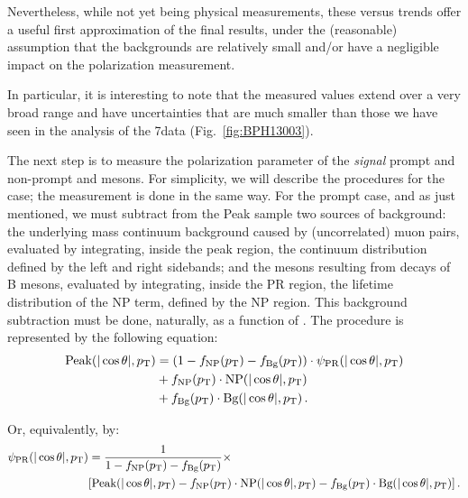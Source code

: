 Nevertheless, while not yet being physical measurements, 
these \lth versus \pt trends offer a useful first approximation of the final results,
under the (reasonable) assumption that 
the backgrounds are relatively small and/or have a negligible 
impact on the polarization measurement.

In particular, it is interesting to note that the measured values 
extend over a very broad \pt range 
and have uncertainties that are much smaller than those we have seen 
in the analysis of the 7\TeV data (Fig.~\ref{fig:BPH13003}).

\vfill\newpage

The next step is to measure the \lth polarization parameter of the \emph{signal} 
prompt and non-prompt \jpsi and \psip mesons. 
For simplicity, we will describe the procedures for the \jpsi case;
the \psip measurement is done in the same way.
For the prompt case, and as just mentioned, 
we must subtract from the Peak sample two sources of background:
the underlying mass continuum background caused by (uncorrelated) muon pairs, 
evaluated by integrating, inside the \jpsi peak region, 
the continuum distribution defined by the left and right sidebands;
and the \jpsi mesons resulting from decays of B mesons,
evaluated by integrating, inside the PR region, 
the lifetime distribution of the NP term, defined by the NP region.
This background subtraction must be done, naturally, as a function of \pt.
The procedure is represented by the following equation:
\begin{equation}
\begin{split} 
\text{Peak}(|\cos\theta|,p_\text{T}) 
&= (1 - f_{\rm NP}(p_\text{T}) - f_{\rm Bg}(p_\text{T})) \cdot \psi_\mathrm{PR}(|\cos\theta|,p_\text{T}) \\
&+ f_{\rm NP}(p_\text{T}) \cdot \text{NP}(|\cos\theta|,p_\text{T}) \\
&+ f_{\rm Bg}(p_\text{T}) \cdot \text{Bg}(|\cos\theta|,p_\text{T}) \, .
\end{split}
\label{eq:bkgSub_psi_PR}
\end{equation}

Or, equivalently, by:
\begin{equation}
\begin{split} 
\psi_\mathrm{PR}(|\cos\theta|,p_\text{T}) 
&= \frac{1}{1 - f_{\rm NP}(p_\text{T}) - f_{\rm Bg}(p_\text{T})} \times \\
& [ \text{Peak}(|\cos\theta|,p_\text{T}) 
- f_{\rm NP}(p_\text{T}) \cdot \text{NP}(|\cos\theta|,p_\text{T}) 
- f_{\rm Bg}(p_\text{T}) \cdot \text{Bg}(|\cos\theta|,p_\text{T}) ] \, .
\end{split}
\label{eq:bkgSub2}
\end{equation}

